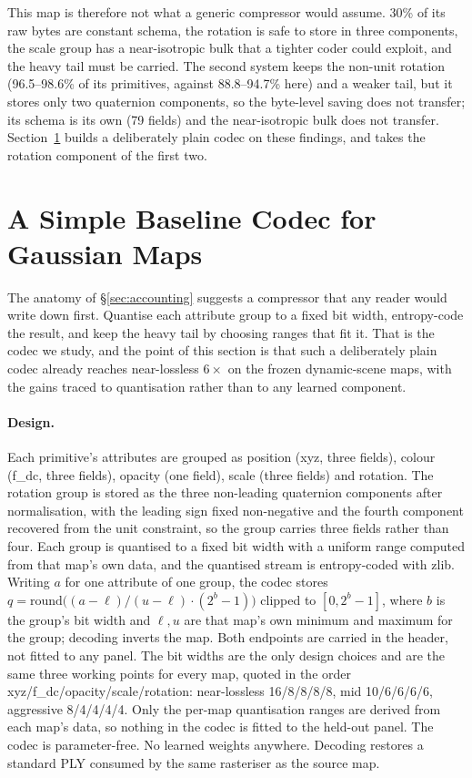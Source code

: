 \documentclass[10pt,twocolumn,letterpaper]{article}
\newcommand{\gate}[1]{{#1}} %
\begin{document}
This map is therefore not what a generic compressor would assume. 30\% of its raw bytes are constant
schema, the rotation is safe to store in three components, the scale group has a
near-isotropic bulk that a tighter coder could exploit, and the
heavy tail must be carried. The second system keeps the non-unit rotation (\gate{96.5--98.6\%} of
its primitives, against \gate{88.8--94.7\%} here) and a weaker tail, but it stores only two
quaternion components, so the byte-level saving does not transfer; its schema is its own
(79 fields) and the near-isotropic bulk does not transfer.
Section~\ref{sec:codec} builds a deliberately plain codec on these findings, and takes the
rotation component of the first two.

\section{A Simple Baseline Codec for Gaussian Maps}
\label{sec:codec}

The anatomy of \S\ref{sec:accounting} suggests a compressor that any reader would write down first.
Quantise each attribute group to a fixed bit width, entropy-code the result,
and keep the heavy tail by choosing ranges that fit it. That is the codec we study, and
the point of this section is that such a deliberately plain codec already reaches
near-lossless $6\times$ on the frozen dynamic-scene maps, with the gains traced to
quantisation rather than to any learned component.

\paragraph{Design.}
Each primitive's attributes are grouped as position (xyz, three fields), colour
(f\_dc, three fields), opacity (one field), scale (three fields) and rotation. The
rotation group is stored as the three non-leading quaternion components after
normalisation, with the leading sign fixed non-negative and the fourth component
recovered from the unit constraint, so the group carries three fields rather than four.
Each group is quantised to a fixed bit width with a uniform range computed from that
map's own data, and the quantised stream is entropy-coded with zlib.
Writing $a$ for one attribute of one group, the codec stores
$q=\mathrm{round}\big((a-\ell)/(u-\ell)\cdot(2^{b}-1)\big)$ clipped to
$[0,2^{b}-1]$, where $b$ is the group's bit width and $\ell,u$ are that map's own
minimum and maximum for the group; decoding inverts the map. Both endpoints are carried
in the header, not fitted to any panel.
The bit widths are the only design choices and are the same three working
points for every map, quoted in the order
xyz/f\_dc/opacity/scale/rotation: near-lossless
\gate{16/8/8/8/8}, mid \gate{10/6/6/6/6}, aggressive \gate{8/4/4/4/4}. %
Only the per-map quantisation ranges are derived from each map's data, so nothing in
the codec is fitted to the held-out panel. The codec is parameter-free. No learned weights anywhere.
Decoding restores a standard PLY consumed by the same rasteriser as the source map.
\end{document}
